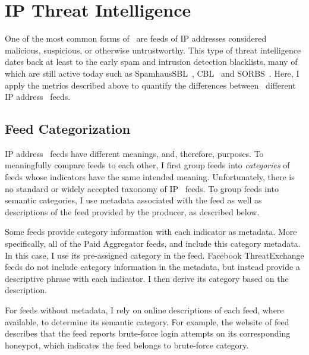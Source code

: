 \section{IP Threat Intelligence}
\label{sec:ip-analysis}

One of the most common forms of \ti\ are feeds of IP addresses considered malicious,
suspicious, or otherwise untrustworthy. This type of threat intelligence dates back
at least to the early spam and intrusion detection blacklists, many of which are
still active today such as SpamhausSBL~\cite{SpamhausSBL}, CBL~\cite{CBL} and
SORBS~\cite{SORBS}. Here, I apply the metrics described above to quantify the
differences between \numipfeeds\ different IP address \ti\ feeds.


\subsection{Feed Categorization}
IP address \ti\ feeds have different meanings, and, therefore, purposes. To
meaningfully compare feeds to each other, I first group feeds into
\emph{categories} of feeds whose indicators have the same intended meaning.
Unfortunately, there is no standard or widely accepted taxonomy of IP \ti\ feeds.
To group feeds into semantic categories, I use metadata associated with the
feed as well as descriptions of the feed provided by the producer, as described below.

 Some feeds provide category information with each indicator as
metadata. More specifically, all of the {Paid Aggregator} feeds, {\feedalienvault}
and {\feedetiprep} include this category metadata. In this case, I use its pre-assigned
category in the feed. Facebook ThreatExchange feeds do not include category
information in the metadata, but instead provide a descriptive phrase with each indicator.
I then derive its category based on the description.

 For feeds without metadata, I rely on online descriptions
of each feed, where available, to determine its semantic category. For example, the
website of feed {\feednothink}~\cite{Nothink} describes that the feed reports brute-force
login attempts on its corresponding honeypot, which indicates the feed belongs to
brute-force category.

